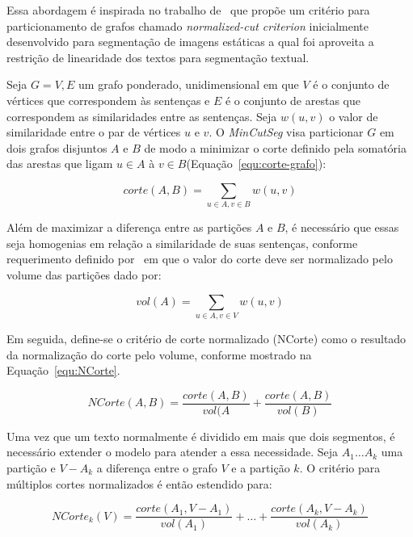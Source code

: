 Essa abordagem é inspirada no trabalho de~\cite{Shi2000} que propõe um critério para particionamento de grafos chamado \textit{normalized-cut criterion} inicialmente desenvolvido para segmentação de imagens estáticas a qual foi aproveita a restrição de linearidade dos textos para segmentação textual.

Seja $G = {V,E}$ um grafo ponderado, unidimensional em que $V$ é o conjunto de vértices que correspondem às sentenças e $E$ é o conjunto de arestas que correspondem as similaridades entre as sentenças. Seja $w(u, v)$ o valor de similaridade entre o par de vértices $u$ e $v$. O \textit{MinCutSeg} visa particionar $G$ em dois grafos disjuntos $A$ e $B$ de modo a minimizar o corte definido pela somatória das arestas que ligam $u \in A$ à $v \in B$(Equação~\ref{equ:corte-grafo}):

\begin{equation} 
	corte(A,B) = \sum_{u \in A,v \in B} w(u, v) 
	\label{equ:corte-grafo}
\end{equation}



Além de maximizar a diferença entre as partições $A$ e $B$, é necessário que essas seja homogenias em relação a similaridade de suas sentenças, conforme requerimento definido por~\cite{Shi2000} em que o valor do corte deve ser normalizado pelo volume das partições dado por:

\begin{equation}
	vol(A) = \sum_{u \in A, v \in V} w(u, v)
\end{equation}


Em seguida, define-se o critério de corte normalizado (NCorte) como o resultado da normalização do corte pelo volume, conforme mostrado na Equação~\ref{equ:NCorte}.

\begin{equation}
	NCorte(A,B) = \frac{corte(A,B)}{vol(A} + \frac{corte(A,B)}{vol(B)}
	\label{equ:NCorte}
\end{equation}


Uma vez que um texto normalmente é dividido em mais que dois segmentos, é necessário extender o modelo para atender a essa necessidade. Seja $A_1 \dots A_k$ uma partição e $V - A_k$ a diferença entre o grafo $V$ e a partição $k$. O critério para múltiplos cortes normalizados é então estendido para: 

\begin{equation} 
	NCorte_k(V) = \frac{corte(A_1, V-A_1)}{vol(A_1)} + \dots + \frac{corte(A_k, V-A_k)}{vol(A_k)} 
	\label{equ:NCorte-k}
\end{equation}


